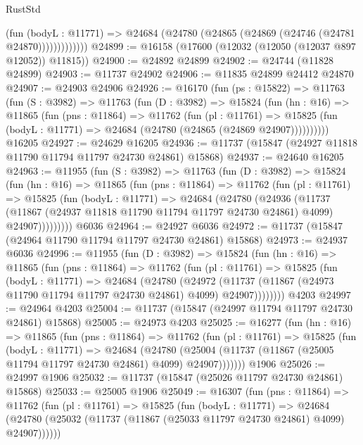 \begin{lexlean}{RustStd}
\begin{coremodule}
                  (fun (bodyL : @11771) =>
                  @24684 (@24780 (@24865 (@24869 (@24746 (@24781 @24870)))))))))))))
@24899 := @16158 (@17600 (@12032 (@12050 (@12037 @897 @12052)) @11815))
@24900 := @24892 @24899
@24902 := @24744 (@11828 @24899)
@24903 := @11737 @24902
@24906 := @11835 @24899 @24412 @24870
@24907 := @24903 @24906
@24926 := @16170
    (fun (ps : @15822) =>
    @11763
      (fun (S : @3982) =>
      @11763
        (fun (D : @3982) =>
        @15824
          (fun (hn : @16) =>
          @11865
            (fun (pns : @11864) =>
            @11762
              (fun (pl : @11761) =>
              @15825 (fun (bodyL : @11771) => @24684 (@24780 (@24865 (@24869 @24907))))))))))
    @16205
@24927 := @24629 @16205
@24936 := @11737 (@15847 (@24927 @11818 @11790 @11794 @11797 @24730 @24861) @15868)
@24937 := @24640 @16205
@24963 := @11955
    (fun (S : @3982) =>
    @11763
      (fun (D : @3982) =>
      @15824
        (fun (hn : @16) =>
        @11865
          (fun (pns : @11864) =>
          @11762
            (fun (pl : @11761) =>
            @15825
              (fun (bodyL : @11771) =>
              @24684
                (@24780
                  (@24936
                    (@11737
                      (@11867 (@24937 @11818 @11790 @11794 @11797 @24730 @24861) @4099)
                      @24907)))))))))
    @6036
@24964 := @24927 @6036
@24972 := @11737 (@15847 (@24964 @11790 @11794 @11797 @24730 @24861) @15868)
@24973 := @24937 @6036
@24996 := @11955
    (fun (D : @3982) =>
    @15824
      (fun (hn : @16) =>
      @11865
        (fun (pns : @11864) =>
        @11762
          (fun (pl : @11761) =>
          @15825
            (fun (bodyL : @11771) =>
            @24684
              (@24780
                (@24972
                  (@11737 (@11867 (@24973 @11790 @11794 @11797 @24730 @24861) @4099) @24907))))))))
    @4203
@24997 := @24964 @4203
@25004 := @11737 (@15847 (@24997 @11794 @11797 @24730 @24861) @15868)
@25005 := @24973 @4203
@25025 := @16277
    (fun (hn : @16) =>
    @11865
      (fun (pns : @11864) =>
      @11762
        (fun (pl : @11761) =>
        @15825
          (fun (bodyL : @11771) =>
          @24684
            (@24780
              (@25004 (@11737 (@11867 (@25005 @11794 @11797 @24730 @24861) @4099) @24907)))))))
    @1906
@25026 := @24997 @1906
@25032 := @11737 (@15847 (@25026 @11797 @24730 @24861) @15868)
@25033 := @25005 @1906
@25049 := @16307
    (fun (pns : @11864) =>
    @11762
      (fun (pl : @11761) =>
      @15825
        (fun (bodyL : @11771) =>
        @24684 (@24780 (@25032 (@11737 (@11867 (@25033 @11797 @24730 @24861) @4099) @24907))))))

\end{coremodule}
\end{lexlean}
